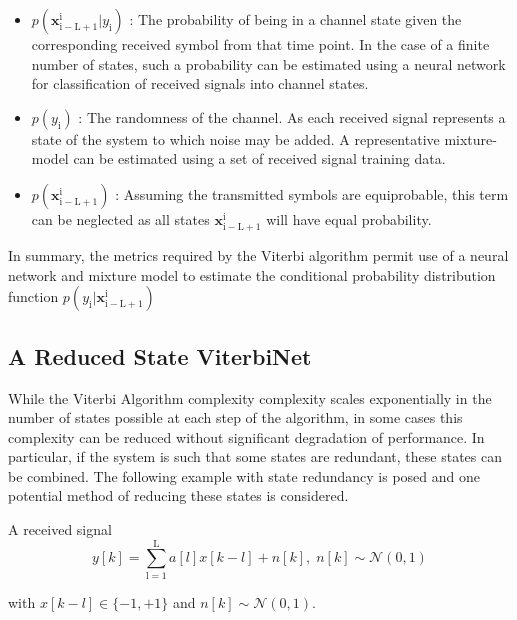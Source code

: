 \documentclass[12pt,a4paper]{report}
\begin{document}
\begin{itemize}
\item $p(\mathbf{x}_{\mathrm{i-L+1}}^{\mathrm{i}}|y_{\mathrm{i}})$
: The probability of being in a channel state given the corresponding received symbol from that time point. In the case of a finite number of states, such a probability can be estimated using a neural network for classification of received signals into channel states. 


\item $p(y_{\mathrm{i}})$
: The randomness of the channel. As each received signal represents a state of the system to which noise may be added. A representative mixture-model can be estimated using a set of received signal training data. 


\item $p(\mathbf{x}_{\mathrm{i-L+1}}^{\mathrm{i}})$
: Assuming the transmitted symbols are equiprobable, this term can be neglected as all states $\mathbf{x}_{\mathrm{i-L+1}}^{\mathrm{i}}$ will have equal probability. 

\end{itemize}

In summary, the metrics required by the Viterbi algorithm permit use of a neural network and mixture model to estimate the conditional probability distribution function $p(y_{\mathrm{i}}|\mathbf{x}_{\mathrm{i-L+1}}^{\mathrm{i}})$
\subsection{A Reduced State ViterbiNet}
While the Viterbi Algorithm complexity complexity scales exponentially in the number of states possible at each step of the algorithm, in some cases this complexity can be reduced without significant degradation of performance. In particular, if the system is such that some states are redundant, these states can be combined. The following example with state redundancy is posed and one potential method of reducing these states is considered. 

A received signal 
\begin{equation}
y[k] = \sum_{\mathrm{l=1}}^{\mathrm{L}} a[l]x[k-l] + n[k], \; n[k]  \sim \mathcal{N}(0,1)
\end{equation}

with $x[k-l] \in \{ -1, +1\}$ and $n[k]  \sim \mathcal{N}(0,1)$.  
\end{document}
